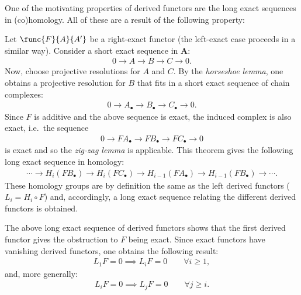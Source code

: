 	One of the motivating properties of derived functors are the long exact sequences in (co)homology. All of these are a result of the following property:
	\begin{property}
		Let $\func{F}{A}{A'}$ be a right-exact functor (the left-exact case proceeds in a similar way). Consider a short exact sequence in $\mathbf{A}$:
		\begin{gather}
			0\longrightarrow A\longrightarrow B\longrightarrow C\longrightarrow 0.
		\end{gather}
		Now, choose projective resolutions for $A$ and $C$. By the \textit{horseshoe lemma}, one obtains a projective resolution for $B$ that fits in a short exact sequence of chain complexes:
		\begin{gather}
			0\longrightarrow A_\bullet\longrightarrow B_\bullet\longrightarrow C_\bullet\longrightarrow 0.
		\end{gather}
		Since $F$ is additive and the above sequence is exact, the induced complex is also exact, i.e.~the sequence
		\begin{gather}
			0\longrightarrow FA_\bullet\longrightarrow FB_\bullet\longrightarrow FC_\bullet\longrightarrow0
		\end{gather}
		is exact and so the \textit{zig-zag lemma} is applicable. This theorem gives the following long exact sequence in homology:
		\begin{gather}
			\cdots\longrightarrow H_i(FB_\bullet)\longrightarrow H_i(FC_\bullet) \longrightarrow H_{i-1}(FA_\bullet) \longrightarrow H_{i-1}(FB_\bullet) \longrightarrow\cdots.
		\end{gather}
		These homology groups are by definition the same as the left derived functors ($L_i = H_i\circ F$) and, accordingly, a long exact sequence relating the different derived functors is obtained.
	\end{property}
	\begin{result}
		The above long exact sequence of derived functors shows that the first derived functor gives the obstruction to $F$ being exact. Since exact functors have vanishing derived functors, one obtains the following result:
		\begin{gather}
			L_1F = 0\implies L_iF=0\qquad\forall i\geq 1,
		\end{gather}
        and, more generally:
        \begin{gather}
            L_iF = 0\implies L_jF=0\qquad\forall j\geq i.
        \end{gather}
	\end{result}


